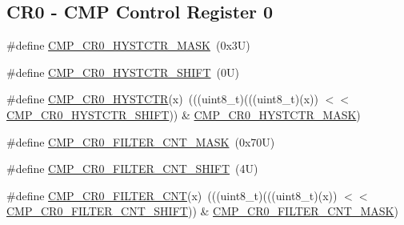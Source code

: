 \subsection*{C\+R0 -\/ C\+MP Control Register 0}
\begin{DoxyCompactItemize}
\item 
\#define \mbox{\hyperlink{group___c_m_p___register___masks_ga9a81a95d8ceda15abb107f3c961e2f03}{C\+M\+P\+\_\+\+C\+R0\+\_\+\+H\+Y\+S\+T\+C\+T\+R\+\_\+\+M\+A\+SK}}~(0x3\+U)
\item 
\#define \mbox{\hyperlink{group___c_m_p___register___masks_ga12a965eae39b79d9e6066de9af418df3}{C\+M\+P\+\_\+\+C\+R0\+\_\+\+H\+Y\+S\+T\+C\+T\+R\+\_\+\+S\+H\+I\+FT}}~(0\+U)
\item 
\#define \mbox{\hyperlink{group___c_m_p___register___masks_ga78eaf28aa2956818501310daaeffca74}{C\+M\+P\+\_\+\+C\+R0\+\_\+\+H\+Y\+S\+T\+C\+TR}}(x)~(((uint8\+\_\+t)(((uint8\+\_\+t)(x)) $<$$<$ \mbox{\hyperlink{group___c_m_p___register___masks_ga12a965eae39b79d9e6066de9af418df3}{C\+M\+P\+\_\+\+C\+R0\+\_\+\+H\+Y\+S\+T\+C\+T\+R\+\_\+\+S\+H\+I\+FT}})) \& \mbox{\hyperlink{group___c_m_p___register___masks_ga9a81a95d8ceda15abb107f3c961e2f03}{C\+M\+P\+\_\+\+C\+R0\+\_\+\+H\+Y\+S\+T\+C\+T\+R\+\_\+\+M\+A\+SK}})
\item 
\#define \mbox{\hyperlink{group___c_m_p___register___masks_gab1e98c122818fe880217f72fab932ac2}{C\+M\+P\+\_\+\+C\+R0\+\_\+\+F\+I\+L\+T\+E\+R\+\_\+\+C\+N\+T\+\_\+\+M\+A\+SK}}~(0x70\+U)
\item 
\#define \mbox{\hyperlink{group___c_m_p___register___masks_ga07a4d57ab7d44b55b3d73f612aa7dd98}{C\+M\+P\+\_\+\+C\+R0\+\_\+\+F\+I\+L\+T\+E\+R\+\_\+\+C\+N\+T\+\_\+\+S\+H\+I\+FT}}~(4\+U)
\item 
\#define \mbox{\hyperlink{group___c_m_p___register___masks_ga1f6d81f303672acd661263de6da7ea13}{C\+M\+P\+\_\+\+C\+R0\+\_\+\+F\+I\+L\+T\+E\+R\+\_\+\+C\+NT}}(x)~(((uint8\+\_\+t)(((uint8\+\_\+t)(x)) $<$$<$ \mbox{\hyperlink{group___c_m_p___register___masks_ga07a4d57ab7d44b55b3d73f612aa7dd98}{C\+M\+P\+\_\+\+C\+R0\+\_\+\+F\+I\+L\+T\+E\+R\+\_\+\+C\+N\+T\+\_\+\+S\+H\+I\+FT}})) \& \mbox{\hyperlink{group___c_m_p___register___masks_gab1e98c122818fe880217f72fab932ac2}{C\+M\+P\+\_\+\+C\+R0\+\_\+\+F\+I\+L\+T\+E\+R\+\_\+\+C\+N\+T\+\_\+\+M\+A\+SK}})
\end{DoxyCompactItemize}
